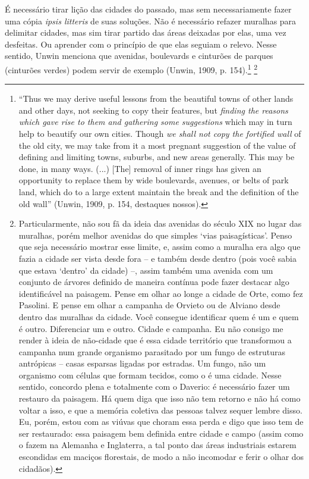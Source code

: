 \documentclass[12pt, a4paper]{book} %
\begin{document}
        É necessário tirar lição das cidades do passado, mas sem necessariamente fazer uma cópia \textit{ipsis litteris} de suas soluções. Não é necessário refazer muralhas para delimitar cidades, mas sim tirar partido das áreas deixadas por elas, uma vez desfeitas. Ou aprender com o princípio de que elas seguiam o relevo. Nesse sentido, Unwin menciona que avenidas, boulevards e cinturões de parques (cinturões verdes) podem servir de exemplo (Unwin, 1909, p. 154).\footnote[43]{``Thus we may derive useful lessons from the beautiful towns of other lands and other days, not seeking to copy their features, but \textit{finding the reasons which gave rise to them and gathering some suggestions} which may in turn help to beautify our own cities. Though \textit{we shall not copy the fortified wall} of the old city, we may take from it a most pregnant suggestion of the value of defining and limiting towns, suburbs, and new areas generally. This may be done, in many ways. (...) [The] removal of inner rings has given an opportunity to replace them by wide boulevards, avenues, or belts of park land, which do to a large extent maintain the break and the definition of the old wall'' (Unwin, 1909, p. 154, destaques nossos).} \footnote[44]{Particularmente, não sou fã da ideia das avenidas do século XIX no lugar das muralhas, porém melhor avenidas do que simples `vias paisagísticas'. Penso que seja necessário mostrar esse limite, e, assim como a muralha era algo que fazia a cidade ser vista desde fora – e também desde dentro (pois você sabia que estava `dentro' da cidade) –, assim também uma avenida com um conjunto de árvores definido de maneira contínua pode fazer destacar algo identificável na paisagem. Pense em olhar ao longe a cidade de Orte, como fez Pasolini. E pense em olhar a campanha de Orvieto ou de Alviano desde dentro das muralhas da cidade. Você consegue identificar quem é um e quem é outro. Diferenciar um e outro. Cidade e campanha. Eu não consigo me render à ideia de não-cidade que é essa cidade território que transformou a campanha num grande organismo parasitado por um fungo de estruturas antrópicas – casas esparsas ligadas por estradas. Um fungo, não um organismo com células que formam tecidos, como o é uma cidade. Nesse sentido, concordo plena e totalmente com o Daverio: é necessário fazer um restauro da paisagem. Há quem diga que isso não tem retorno e não há como voltar a isso, e que a memória coletiva das pessoas talvez sequer lembre disso. Eu, porém, estou com as viúvas que choram essa perda e digo que isso tem de ser restaurado: essa paisagem bem definida entre cidade e campo (assim como o fazem na Alemanha e Inglaterra, a tal ponto das áreas industriais estarem escondidas em maciços florestais, de modo a não incomodar e ferir o olhar dos cidadãos).}
\end{document}
